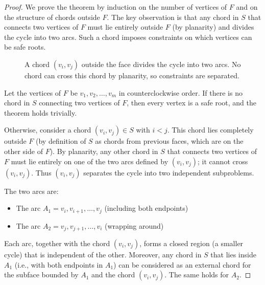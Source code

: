 \begin{proof}
    We prove the theorem by induction on the number of vertices of \(F\) and on the structure of chords outside \(F\). 
    The key observation is that any chord in \(S\) that connects two vertices of \(F\) must lie entirely outside \(F\) (by planarity) and divides the cycle into two arcs. 
    Such a chord imposes constraints on which vertices can be safe roots.

    \begin{figure}[htbp]
        \centering
        \caption{A chord \((v_i, v_j)\) outside the face divides the cycle into two arcs. No chord can cross this chord by planarity, so constraints are separated.}
        \label{fig:external_chord}
    \end{figure}

    Let the vertices of \(F\) be \(v_1, v_2, \dots, v_m\) in counterclockwise order. 
    If there is no chord in \(S\) connecting two vertices of \(F\), then every vertex is a safe root, and the theorem holds trivially.

    Otherwise, consider a chord \((v_i, v_j) \in S\) with \(i < j\). 
    This chord lies completely outside \(F\) (by definition of \(S\) as chords from previous faces, which are on the other side of \(F\)). 
    By planarity, any other chord in \(S\) that connects two vertices of \(F\) must lie entirely on one of the two arcs defined by \((v_i, v_j)\); it cannot cross \((v_i, v_j)\). 
    Thus \((v_i, v_j)\) separates the cycle into two independent subproblems.

    The two arcs are:
    \begin{itemize}
        \item The arc \(A_1 = v_i, v_{i+1}, \dots, v_j\) (including both endpoints)
        \item The arc \(A_2 = v_j, v_{j+1}, \dots, v_i\) (wrapping around)
    \end{itemize}
    Each arc, together with the chord \((v_i, v_j)\), forms a closed region (a smaller cycle) that is independent of the other. 
    Moreover, any chord in \(S\) that lies inside \(A_1\) (i.e., with both endpoints in \(A_1\)) can be considered as an external chord for the subface bounded by \(A_1\) and the chord \((v_i, v_j)\). 
    The same holds for \(A_2\).


\end{proof}

